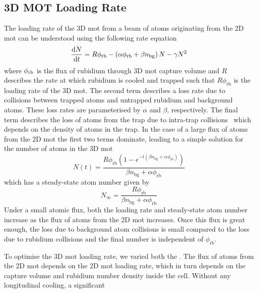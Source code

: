 \subsection{3D MOT Loading Rate}\label{subsec:loading_rate}

The loading rate of the 3D \ac{mot} from a beam of atoms originating from the 2D
\ac{mot} can be understood using the following rate equation
\begin{equation}
	\frac{\mathrm{d} N}{\mathrm{d}t} = R  \phi_\textnormal{rb} - \left(\alpha \phi_\textnormal{rb}  + \beta n_\textnormal{bg} \right) N - \gamma N^2
	\label{eq:loading_rate}
\end{equation}
where \(\phi_\textnormal{rb}\) is the flux of rubidium through 3D \ac{mot}
capture volume and \(R\) describes the rate at which rubidium is cooled and
trapped such that \( R \phi_\text{rb}\) is the loading rate of the 3D \ac{mot}.
The second term describes a loss rate due to collisions between trapped atoms
and untrapped rubidium and background atoms. These loss rates are parameterised
by \(\alpha\) and \(\beta\), respectively. The final term describes the loss of
atoms from the trap due to intra-trap collisions~\cite{Prentiss1988} which
depends on the density of atoms in the trap. In the case of a large flux of
atoms from the 2D \ac{mot} the first two terms dominate, leading to a simple
solution for the number of atoms in the 3D \ac{mot}
\begin{equation}
	N(t) = \frac{R \phi _{\text{rb}} \left(1-e^{-t \left(\beta  n_{\text{bg}}+\alpha  \phi _{\text{rb}}\right)}\right)}{\beta  n_{\text{bg}}+\alpha  \phi _{\text{rb}}}
	\label{eq:atom_number}
\end{equation}
which has a steady-state atom number given by
\begin{equation}
	N_\infty = \frac{R \phi _{\text{rb}}}{\beta  n_{\text{bg}}+\alpha  \phi _{\text{rb}}}
\end{equation}
Under a small atomic flux, both the loading rate and steady-state atom number
increase as the flux of atoms from the 2D \ac{mot} increases. Once this flux is
great enough, the loss due to background atom collisions is small compared to
the loss due to rubidium collisions and the final number is independent of
\(\phi_\text{rb}\). \par\noindent To optimise the 3D \ac{mot} loading rate, we
varied both the . The flux of atoms from the 2D \ac{mot} depends on the 2D
\ac{mot} loading rate, which in turn depends on the capture volume and rubidium
number density inside the cell.  Without any longitudinal cooling, a significant
